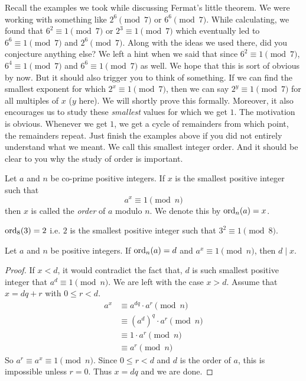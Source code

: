 \documentclass{subfile}
\begin{document}
Recall the examples we took while discussing Fermat's little theorem. We were working with something like $2^6\pmod7$ or $6^6\pmod7$. While calculating, we found that $6^2\equiv1\pmod7$ or $2^3\equiv1\pmod7$ which eventually led to $6^6\equiv1\pmod7$ and $2^6\pmod7$. Along with the ideas we used there, did you conjecture anything else? We left a hint when we said that since $6^2\equiv1\pmod7$, $6^4\equiv1\pmod7$ and $6^6\equiv1\pmod7$ as well. We hope that this is sort of obvious by now. But it should also trigger you to think of something. If we can find the smallest exponent for which $2^x\equiv1\pmod7$, then we can say $2^y\equiv1\pmod7$ for all multiples of $x$ ($y$ here). We will shortly prove this formally. Moreover, it also encourages us to study these \textit{smallest }values for which we get $1$. The motivation is obvious. Whenever we get $1$, we get a cycle of remainders from which point, the remainders repeat. Just finish the examples above if you did not entirely understand what we meant. We call this smallest integer order. And it should be clear to you why the study of order is important.
	\begin{definition}
		Let $a$ and $n$ be co-prime positive integers. If $x$ is the smallest positive integer such that  \[a^x\equiv1\pmod n\] then $x$ is called the \textit{order} of $a$ modulo $n$. We denote this by $\operatorname{ord}_n(a)=x$.
	\end{definition}

	\begin{example}
		$\operatorname{ord}_8(3)=2$ i.e. $2$ is the smallest positive integer such that  $3^2\equiv1\pmod 8$.
	\end{example}


	\begin{theorem}\label{thm:ordDiv}
		Let $a$ and $n$ be positive integers. If $\operatorname{ord}_n(a)=d$ and $a^x\equiv1\pmod n$, then $d\mid x$.
	\end{theorem}

	\begin{proof}
		If $x<d$, it would contradict the fact that, $d$ is such smallest positive integer that $a^d\equiv1\pmod n$. We are left with the case $x>d$. Assume that $x=dq+r$ with $0\leq r<d$.
			\begin{align*}
				a^x
					& \equiv a^{dq}\cdot a^r\pmod{n}\\
					& \equiv (a^d)^q \cdot a^r\pmod{n}\\
					& \equiv 1 \cdot a^r\pmod{n}\\
					& \equiv a^r \pmod n
			\end{align*}
		So $a^r \equiv a^x \equiv 1 \pmod n$. Since $0\leq r<d$ and $d$ is the order of $a$, this is impossible unless $r=0$. Thus $x=dq$ and we are done.
	\end{proof}
\end{document}
